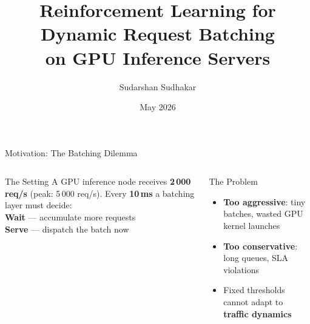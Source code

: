 \documentclass[aspectratio=169]{beamer}
\title[RL-Based Dynamic Request Batching]
      {\textbf{Reinforcement Learning for\\Dynamic Request Batching}\\
       \small on GPU Inference Servers}
\author{Sudarshan Sudhakar}
\institute[]{Semester 6 RL Project}
\date{May 2026}
\begin{document}

\begin{frame}[plain]
  \vspace{0.8cm}
  \titlepage
\end{frame}

\begin{frame}{Motivation: The Batching Dilemma}
  \begin{columns}[T]
      \begin{block}{The Setting}
        A GPU inference node receives \textbf{2\,000 req/s} (peak: 5\,000 req/s).
        Every \textbf{10\,ms} a batching layer must decide:\\[4pt]
        \quad \textcolor{ppoBlue}{\textbf{Wait}} — accumulate more requests\\
        \quad \textcolor{cfOrange}{\textbf{Serve}} — dispatch the batch now
      \end{block}
      \vspace{6pt}
      \begin{alertblock}{The Problem}
        \begin{itemize}
          \item \textbf{Too aggressive}: tiny batches, wasted GPU kernel launches
          \item \textbf{Too conservative}: long queues, SLA violations
          \item Fixed thresholds cannot adapt to \textbf{traffic dynamics}
        \end{itemize}
      \end{alertblock}


\end{columns}
\end{frame}
\end{document}

